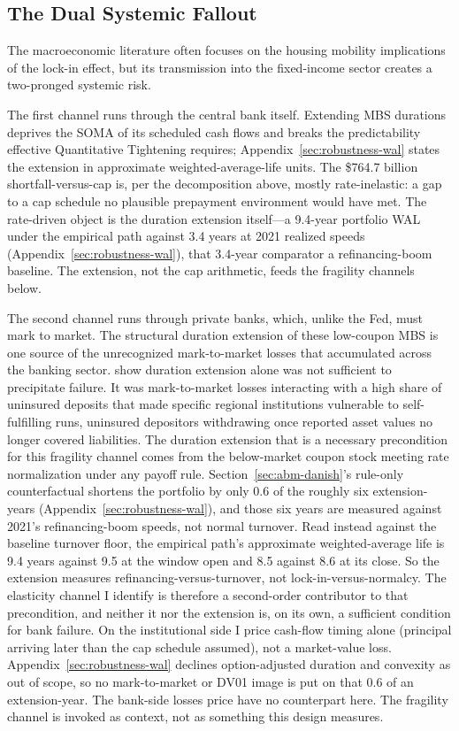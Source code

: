 \documentclass[12pt]{article}
\begin{document}
\subsection{The Dual Systemic Fallout}\label{sec:discussion-fallout}

The macroeconomic literature often focuses on the housing mobility implications of the lock-in effect, but its transmission into the fixed-income sector creates a two-pronged systemic risk.

The first channel runs through the central bank itself. Extending MBS durations deprives the SOMA of its scheduled cash flows and breaks the predictability effective Quantitative Tightening requires; Appendix~\ref{sec:robustness-wal} states the extension in approximate weighted-average-life units. The \$764.7 billion shortfall-versus-cap is, per the decomposition above, mostly rate-inelastic: a gap to a cap schedule no plausible prepayment environment would have met. The rate-driven object is the duration extension itself---a 9.4-year portfolio WAL under the empirical path against 3.4 years at 2021 realized speeds (Appendix~\ref{sec:robustness-wal}), that 3.4-year comparator a refinancing-boom baseline. The extension, not the cap arithmetic, feeds the fragility channels below.

The second channel runs through private banks, which, unlike the Fed, must mark to market. The structural duration extension of these low-coupon MBS is one source of the unrecognized mark-to-market losses that accumulated across the banking sector. \citet{jiang2023} show duration extension alone was not sufficient to precipitate failure. It was mark-to-market losses interacting with a high share of uninsured deposits that made specific regional institutions vulnerable to self-fulfilling runs, uninsured depositors withdrawing once reported asset values no longer covered liabilities. The duration extension that is a necessary precondition for this fragility channel comes from the below-market coupon stock meeting rate normalization under any payoff rule. Section~\ref{sec:abm-danish}'s rule-only counterfactual shortens the portfolio by only 0.6 of the roughly six extension-years (Appendix~\ref{sec:robustness-wal}), and those six years are measured against 2021's refinancing-boom speeds, not normal turnover. Read instead against the baseline turnover floor, the empirical path's approximate weighted-average life is 9.4 years against 9.5 at the window open and 8.5 against 8.6 at its close. So the extension measures refinancing-versus-turnover, not lock-in-versus-normalcy. The elasticity channel I identify is therefore a second-order contributor to that precondition, and neither it nor the extension is, on its own, a sufficient condition for bank failure. On the institutional side I price cash-flow timing alone (principal arriving later than the cap schedule assumed), not a market-value loss. Appendix~\ref{sec:robustness-wal} declines option-adjusted duration and convexity as out of scope, so no mark-to-market or DV01 image is put on that 0.6 of an extension-year. The bank-side losses \citet{jiang2023} price have no counterpart here. The fragility channel is invoked as context, not as something this design measures.
\end{document}
